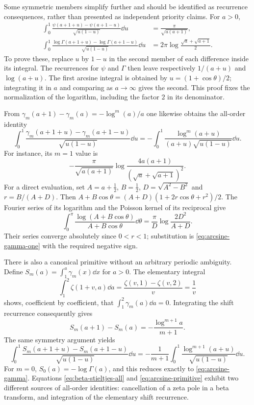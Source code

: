 Some symmetric members simplify further and should be identified
as recurrence consequences, rather than presented as independent
priority claims. For $a>0$,
\begin{align}
 \int_0^1\frac{\psi(a+1+u)-\psi(a+1-u)}{\sqrt{u(1-u)}}\dd u
 &=\frac{\pi}{\sqrt{a(a+1)}},\label{eq:arcsine-psi}\\
 \int_0^1\frac{\log\Gamma(a+1+u)-\log\Gamma(a+1-u)}
                       {\sqrt{u(1-u)}}\dd u
 &=2\pi\log\frac{\sqrt a+\sqrt{a+1}}2.
 \label{eq:arcsine-gamma}
\end{align}
To prove these, replace $u$ by $1-u$ in the second member of each
difference inside its integral. The recurrences for $\psi$ and
$\Gamma$ then leave respectively $1/(a+u)$ and $\log(a+u)$.
The first arcsine integral is obtained by $u=(1+\cos\theta)/2$;
integrating it in $a$ and comparing as $a\to\infty$ gives the
second. This proof fixes the normalization of the logarithm,
including the factor $2$ in its denominator.

From $\gamma_m(a+1)-\gamma_m(a)=-\log^m(a)/a$ one likewise obtains
the all-order identity
\begin{equation}\label{eq:arcsine-stieltjes}
 \int_0^1\frac{\gamma_m(a+1+u)-\gamma_m(a+1-u)}
                      {\sqrt{u(1-u)}}\dd u
 =-\int_0^1\frac{\log^m(a+u)}{(a+u)\sqrt{u(1-u)}}\dd u.
\end{equation}
For instance, its $m=1$ value is
\begin{equation}\label{eq:arcsine-gamma-one}
 -\frac{\pi}{\sqrt{a(a+1)}}
 \log\frac{4a(a+1)}{(\sqrt a+\sqrt{a+1})^2}.
\end{equation}
For a direct evaluation, set $A=a+\tfrac12$, $B=\tfrac12$,
$D=\sqrt{A^2-B^2}$ and $r=B/(A+D)$. Then
$A+B\cos\theta=(A+D)(1+2r\cos\theta+r^2)/2$.
The Fourier series of its logarithm and the Poisson kernel of its
reciprocal give
\[
 \int_0^\pi\frac{\log(A+B\cos\theta)}{A+B\cos\theta}\dd\theta
 =\frac{\pi}{D}\log\frac{2D^2}{A+D}.
\]
Their series converge absolutely since $0<r<1$; substitution is
\eqref{eq:arcsine-gamma-one} with the required negative sign.

There is also a canonical primitive without an arbitrary periodic
ambiguity. Define
$S_m(a)=\int_1^a\gamma_m(x)\dd x$ for $a>0$.
The elementary integral
\[
 \int_1^2\zeta(1+v,a)\dd a
 =\frac{\zeta(v,1)-\zeta(v,2)}{v}=\frac1v
\]
shows, coefficient by coefficient, that $\int_1^2\gamma_m(a)\dd a=0$.
Integrating the shift recurrence consequently gives
\begin{equation}\label{eq:stieltjes-primitive-recurrence}
 S_m(a+1)-S_m(a)=-\frac{\log^{m+1}a}{m+1}.
\end{equation}
The same symmetry argument yields
\begin{equation}\label{eq:arcsine-primitive}
 \int_0^1\frac{S_m(a+1+u)-S_m(a+1-u)}{\sqrt{u(1-u)}}\dd u
 =-\frac1{m+1}\int_0^1\frac{\log^{m+1}(a+u)}{\sqrt{u(1-u)}}\dd u.
\end{equation}
For $m=0$, $S_0(a)=-\log\Gamma(a)$, and this reduces exactly to
\eqref{eq:arcsine-gamma}. Equations
\eqref{eq:beta-stieltjes-all} and \eqref{eq:arcsine-primitive}
exhibit two different sources of all-order identities: cancellation
of a zeta pole in a beta transform, and integration of the elementary
shift recurrence.
